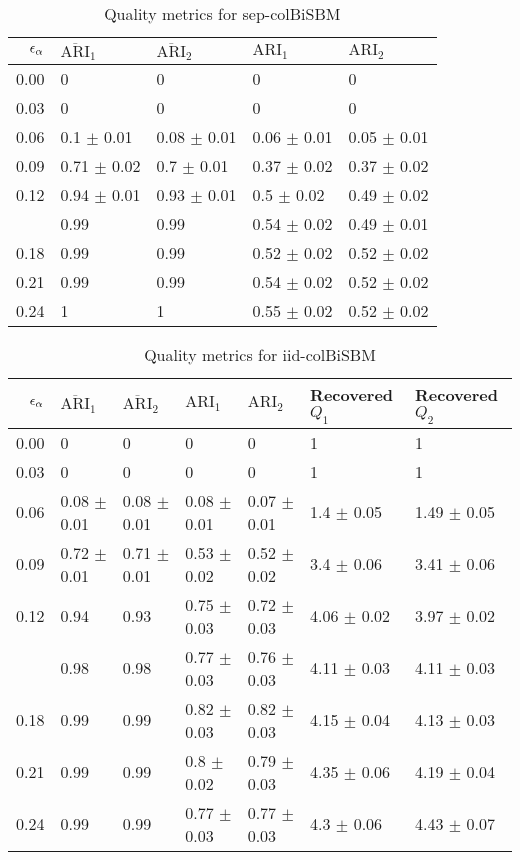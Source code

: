 \begin{table}[!h]

\caption{\label{tab:per_model_table}\label{tab:per_model_sep}Quality metrics for sep-colBiSBM}
\centering
\begin{tabular}[t]{rllll}
\toprule
$\eps[\alpha]$ & $\overline{\text{ARI}}_{1}$ & $\overline{\text{ARI}}_{2}$ & $\text{ARI}_{1}$ & $\text{ARI}_{2}$\\
\midrule
0.00 & 0 & 0 & 0 & 0\\
0.03 & 0 & 0 & 0 & 0\\
0.06 & 0.1 $\pm$ 0.01 & 0.08 $\pm$ 0.01 & 0.06 $\pm$ 0.01 & 0.05 $\pm$ 0.01\\
0.09 & 0.71 $\pm$ 0.02 & 0.7 $\pm$ 0.01 & 0.37 $\pm$ 0.02 & 0.37 $\pm$ 0.02\\
0.12 & 0.94 $\pm$ 0.01 & 0.93 $\pm$ 0.01 & 0.5 $\pm$ 0.02 & 0.49 $\pm$ 0.02\\
\addlinespace
0.15 & 0.99 & 0.99 & 0.54 $\pm$ 0.02 & 0.49 $\pm$ 0.01\\
0.18 & 0.99 & 0.99 & 0.52 $\pm$ 0.02 & 0.52 $\pm$ 0.02\\
0.21 & 0.99 & 0.99 & 0.54 $\pm$ 0.02 & 0.52 $\pm$ 0.02\\
0.24 & 1 & 1 & 0.55 $\pm$ 0.02 & 0.52 $\pm$ 0.02\\
\bottomrule
\end{tabular}
\end{table}
\begin{table}[!h]

\caption{\label{tab:per_model_table}\label{tab:per_model_iid}Quality metrics for iid-colBiSBM}
\centering
\begin{tabular}[t]{rllllll}
\toprule
$\eps[\alpha]$ & $\overline{\text{ARI}}_{1}$ & $\overline{\text{ARI}}_{2}$ & $\text{ARI}_{1}$ & $\text{ARI}_{2}$ & Recovered $Q_1$ & Recovered $Q_2$\\
\midrule
0.00 & 0 & 0 & 0 & 0 & 1 & 1\\
0.03 & 0 & 0 & 0 & 0 & 1 & 1\\
0.06 & 0.08 $\pm$ 0.01 & 0.08 $\pm$ 0.01 & 0.08 $\pm$ 0.01 & 0.07 $\pm$ 0.01 & 1.4 $\pm$ 0.05 & 1.49 $\pm$ 0.05\\
0.09 & 0.72 $\pm$ 0.01 & 0.71 $\pm$ 0.01 & 0.53 $\pm$ 0.02 & 0.52 $\pm$ 0.02 & 3.4 $\pm$ 0.06 & 3.41 $\pm$ 0.06\\
0.12 & 0.94 & 0.93 & 0.75 $\pm$ 0.03 & 0.72 $\pm$ 0.03 & 4.06 $\pm$ 0.02 & 3.97 $\pm$ 0.02\\
\addlinespace
0.15 & 0.98 & 0.98 & 0.77 $\pm$ 0.03 & 0.76 $\pm$ 0.03 & 4.11 $\pm$ 0.03 & 4.11 $\pm$ 0.03\\
0.18 & 0.99 & 0.99 & 0.82 $\pm$ 0.03 & 0.82 $\pm$ 0.03 & 4.15 $\pm$ 0.04 & 4.13 $\pm$ 0.03\\
0.21 & 0.99 & 0.99 & 0.8 $\pm$ 0.02 & 0.79 $\pm$ 0.03 & 4.35 $\pm$ 0.06 & 4.19 $\pm$ 0.04\\
0.24 & 0.99 & 0.99 & 0.77 $\pm$ 0.03 & 0.77 $\pm$ 0.03 & 4.3 $\pm$ 0.06 & 4.43 $\pm$ 0.07\\
\bottomrule
\end{tabular}
\end{table}
